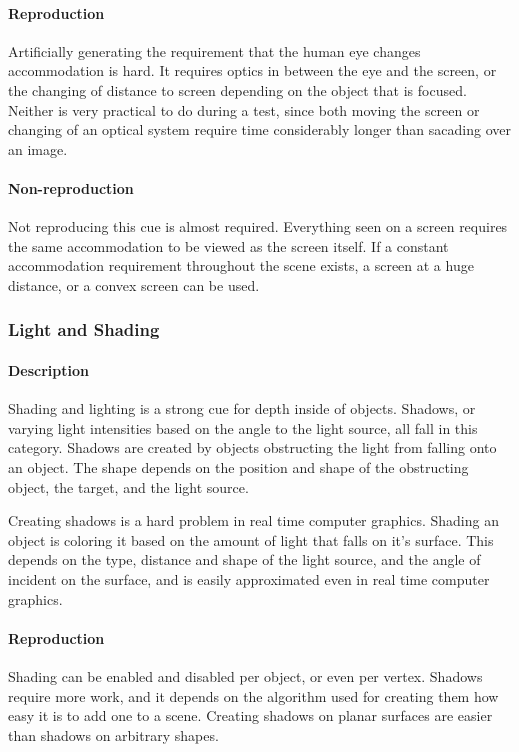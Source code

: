 \paragraph{Reproduction}
Artificially generating the requirement that the human eye changes accommodation is hard.
It requires optics in between the eye and the screen, or the changing of distance to screen depending on the object that is focused.
Neither is very practical to do during a test, since both moving the screen or changing of an optical system require time considerably longer than sacading over an image.

\paragraph{Non-reproduction}
Not reproducing this cue is almost required. Everything seen on a screen requires the same accommodation to be viewed as the screen itself. If a constant accommodation requirement throughout the scene exists, a screen at a huge distance, or a convex screen can be used.


\subsubsection{Light and Shading}
\paragraph{Description}
Shading and lighting is a strong cue for depth inside of objects.
Shadows, or varying light intensities based on the angle to the light source, all fall in this category.
Shadows are created by objects obstructing the light from falling onto an object.
The shape depends on the position and shape of the obstructing object, the target, and the light source.

Creating shadows is a hard problem in real time computer graphics.
Shading an object is coloring it based on the amount of light that falls on it's surface.
This depends on the type, distance and shape of the light source, and the angle of incident on the surface, and is easily approximated even in real time computer graphics.

\paragraph{Reproduction}
Shading can be enabled and disabled per object, or even per vertex.
Shadows require more work, and it depends on the algorithm used for creating them how easy it is to add one to a scene.
Creating shadows on planar surfaces are easier than shadows on arbitrary shapes.

